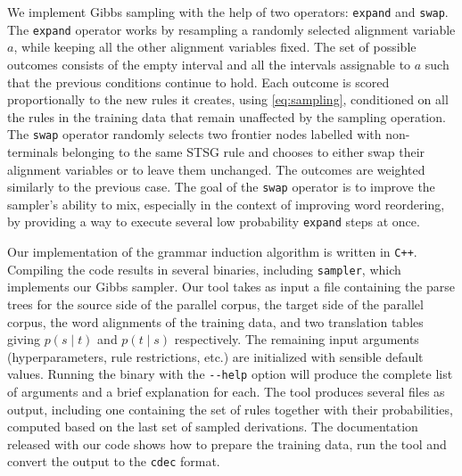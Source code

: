 \documentclass[nofonts]{pbml} %
\begin{document}
We implement Gibbs sampling with the help of two operators: \texttt{expand} and \texttt{swap}. The \texttt{expand} operator works by resampling a randomly selected alignment variable $a$, while keeping all the other alignment variables fixed. The set of possible outcomes consists of the empty interval and all the intervals assignable to $a$ such that the previous conditions continue to hold. Each outcome is scored proportionally to the new rules it creates,  using \autoref{eq:sampling}, conditioned on all the rules in the training data that remain unaffected by the sampling operation. The \texttt{swap} operator randomly selects two frontier nodes labelled with non-terminals belonging to the same STSG rule and chooses to either swap their alignment variables or to leave them unchanged. The outcomes are weighted similarly to the previous case. The goal of the \texttt{swap} operator is to improve the sampler's ability to mix, especially in the context of improving word reordering, by providing a way to execute several low probability \texttt{expand} steps at once.

Our implementation of the grammar induction algorithm is written in \texttt{C++}. Compiling the code results in several binaries, including \texttt{sampler}, which implements our Gibbs sampler.
Our tool takes as input a file containing the parse trees for the source side of the parallel corpus, the target side of the parallel corpus, the word alignments of the training data, and two translation tables giving $p(s \mid t)$ and $p(t \mid s)$ respectively.
The remaining input arguments (hyperparameters, rule restrictions, etc.) are initialized with sensible default values. Running the binary with the \texttt{-{}-help} option will produce the complete list of arguments and a brief explanation for each. The tool produces several files as output, including one containing the set of rules together with their probabilities, computed based on the last set of sampled derivations. The documentation released with our code shows how to prepare the training data, run the tool and convert the output to the \texttt{cdec} format.
\end{document}
